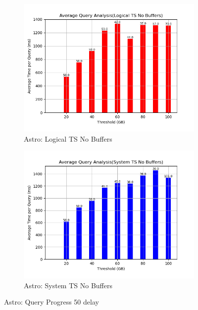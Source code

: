 \begin{figure}
\begin{subfigure}[c]{0.45\textwidth}
	\end{subfigure}
	\begin{subfigure}[c]{0.45\textwidth}
		\includegraphics[width=1\textwidth]	 {figures/Experiments/Dynamic/ASTRO/Batch_processing/50/average_query_time_per_batch_version_999777016_10485760_10_delay[50].png}
		\caption{Astro: Logical TS No Buffers}
		\label{fig:logical-ts-no-50-astro}
	\end{subfigure}
	\begin{subfigure}[c]{0.45\textwidth}
		\includegraphics[width=1\textwidth]	 {figures/Experiments/Dynamic/ASTRO/Batch_processing/50/average_query_time_per_batch_version_999777017_10485760_10_delay[50].png}
		\caption{Astro: System TS No Buffers}
		\label{fig:system-ts-no-50-astro}
	\end{subfigure}
	\caption{Astro: Query Progress 50 delay}
	\label{fig:query-progress-50-astro}
\end{figure}
